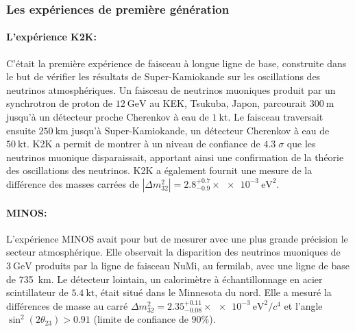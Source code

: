             \subsubsection{Les expériences de première génération}
            
            \paragraph{L'expérience K2K\cite{Collaboration2006a}:} C'était la première expérience de faisceau à longue ligne de base, construite dans le but de vérifier les résultats de Super-Kamiokande sur les oscillations des neutrinos atmosphériques. Un faisceau de neutrinos muoniques produit par un synchrotron de proton de $\SI{12}{\giga\electronvolt}$ au KEK, Tsukuba, Japon, parcourait $\SI{300}{\meter}$ jusqu'à un détecteur proche Cherenkov à eau de $\SI{1}{\kilo\tonne}$. Le faisceau traversait ensuite $\SI{250}{\kilo\meter}$ jusqu'à Super-Kamiokande, un détecteur Cherenkov à eau de $\SI{50}{\kilo\tonne}$. K2K a permit de montrer à un niveau de confiance de $4.3\;\sigma$ que les neutrinos muonique disparaissait, apportant ainsi une confirmation de la théorie des oscillations des neutrinos. K2K a également fournit une mesure de la différence des masses carrées de $|\Delta m^2_{32}|=2.8^{+0.7}_{-0.9}\times\SI{e-3}{\electronvolt\squared}$.
            
            \paragraph{MINOS\cite{Collaboration2014}:} L'expérience MINOS avait pour but de mesurer avec une plus grande précision le secteur atmosphérique. Elle observait la disparition des neutrinos muoniques de $\SI{3}{\giga\electronvolt}$ produits par la ligne de faisceau NuMi, au fermilab, avec une ligne de base de \SI{735}{\kilo\meter}. Le détecteur lointain, un calorimètre à échantillonnage en acier scintillateur de $\SI{5.4}{\kilo\tonne}$, était situé dans le Minnesota du nord. Elle a mesuré la différences de masse au carré $\Delta m_{32}^2 = 2.35^{+0.11}_{-0.08}\times\SI{e-3}{\electronvolt\squared\per c^4}$ et l'angle $\sin^2(2\theta_{23}) > 0.91$ (limite de confiance de 90\%). 
            
